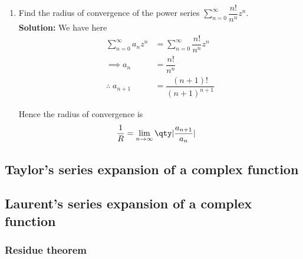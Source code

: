 \begin{enumerate}
				\item Find the radius of convergence of the power series $\sum_{n=0}^{\infty}{\dfrac{n!}{n^n}z^n}$.\\
				\textbf{Solution:} We have here
				\begin{align*}
					\sum_{n=0}^{\infty}{a_nz^n}&=\sum_{n=0}^{\infty}{\dfrac{n!}{n^n}z^n} \\
					\implies a_n&=\dfrac{n!}{n^n} \\
					\therefore\;a_{n+1}&=\dfrac{(n+1)!}{(n+1)^{n+1}}
				\end{align*}
				
				Hence the radius of convergence is
				\begin{align*}
					\dfrac{1}{R}&=\lim_{n\to\infty}{\qty|\dfrac{a_{n+1}}{a_n}|}
				\end{align*}
			\end{enumerate}
	
	\subsection{Taylor's series expansion of a complex function}
	
	\subsection{Laurent's series expansion of a complex function}
	
	\subsubsection{Residue theorem}
